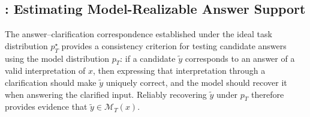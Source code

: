 \subsection{\circleclar{}: Estimating Model-Realizable Answer Support}
\label{sec:circleclar}







The answer--clarification correspondence established under the ideal task distribution \(p_T^\star\) provides a consistency criterion for testing candidate answers using the model distribution \(p_T\):
if a candidate \(\widetilde y\) corresponds to an answer of a valid interpretation of \(x\), then expressing that interpretation through a clarification should make \(\widetilde y\) uniquely correct, and the model should recover it when answering the clarified input. Reliably recovering \(\widetilde y\) under \(p_T\) therefore provides evidence that \(\widetilde y \in \mathcal{M}_T(x)\).


